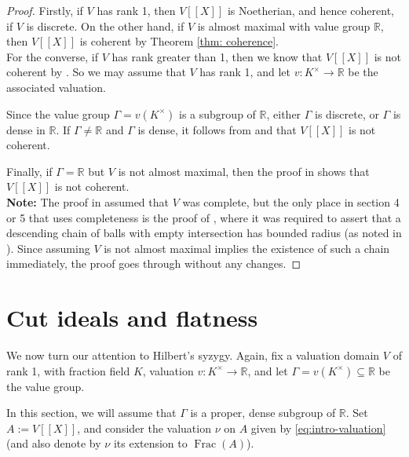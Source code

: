 \documentclass[12pt]{amsart}
\theoremstyle{plain}
\newcommand{\Frac}{\operatorname{Frac}}
\begin{document}
\begin{proof}
Firstly, if $V$ has rank 1, then $V[[X]]$ is Noetherian, and hence coherent, if $V$ is discrete. On the other hand, if $V$ is almost maximal with value group $\mathbb{R}$, then $V[[X]]$ is coherent by Theorem \ref{thm: coherence}.\\

\noindent For the converse, if $V$ has rank greater than 1, then we know that $V[[X]]$ is not coherent by \cite[Section 1]{JondrupSmall}. So we may assume that $V$ has rank 1, and let $v:K^\times\to\mathbb{R}$ be the associated valuation.

Since the value group $\Gamma=v(K^\times)$ is a subgroup of $\mathbb{R}$, either $\Gamma$ is discrete, or $\Gamma$ is dense in $\mathbb{R}$. If $\Gamma\neq\mathbb{R}$ and $\Gamma$ is dense, it follows from \cite[Section 3 Corollary]{coherence1} and \cite[Theorem 3.1]{Jones} that $V[[X]]$ is not coherent. 

Finally, if $\Gamma=\mathbb{R}$ but $V$ is not almost maximal, then the proof in \cite[Section 4 and 5]{Wang} shows that $V[[X]]$ is not coherent.\\

\noindent\textbf{Note:} The proof in \cite{Wang} assumed that $V$ was complete, but the only place in section 4 or 5 that uses completeness is the proof of \cite[Construction Lemma 4.2]{Wang}, where it was required to assert that a descending chain of balls with empty intersection has bounded radius (as noted in \cite[Remark 4.3]{Wang}). Since assuming $V$ is not almost maximal implies the existence of such a chain immediately, the proof goes through without any changes.\end{proof}

\section{Cut ideals and flatness}

\noindent We now turn our attention to Hilbert's syzygy. Again, fix a valuation domain $V$ of rank 1, with fraction field $K$, valuation $v:K^\times\to\mathbb{R}$, and let $\Gamma=v(K^\times)\subseteq\mathbb{R}$ be the value group.

In this section, we will assume that $\Gamma$ is a proper, dense subgroup of $\mathbb{R}$. Set $A:=V[[X]]$, and consider the valuation $\nu$ on $A$ given by \eqref{eq:intro-valuation} (and also denote by $\nu$ its extension to $\Frac(A)$).\\
\end{document}
